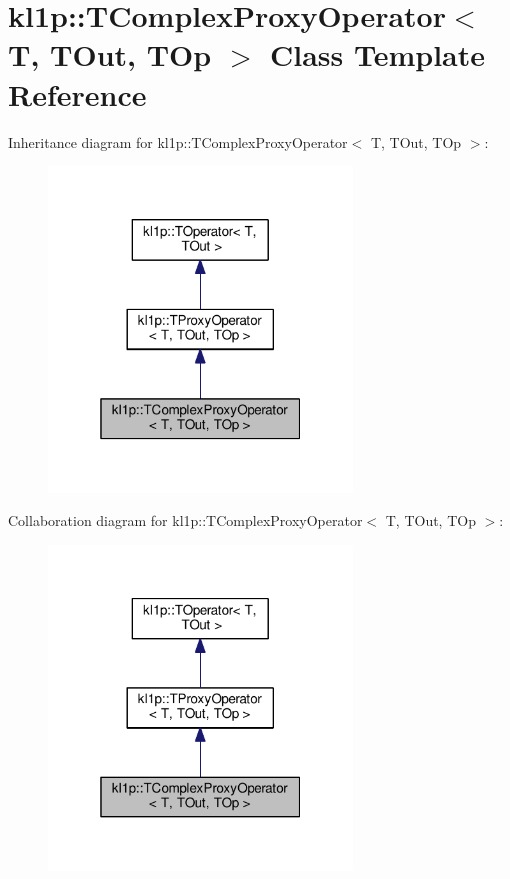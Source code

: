 \hypertarget{classkl1p_1_1TComplexProxyOperator}{}\section{kl1p\+:\+:T\+Complex\+Proxy\+Operator$<$ T, T\+Out, T\+Op $>$ Class Template Reference}
\label{classkl1p_1_1TComplexProxyOperator}


Inheritance diagram for kl1p\+:\+:T\+Complex\+Proxy\+Operator$<$ T, T\+Out, T\+Op $>$\+:
\nopagebreak
\begin{figure}[H]
\begin{center}
\leavevmode
\includegraphics[width=229pt]{classkl1p_1_1TComplexProxyOperator__inherit__graph}
\end{center}
\end{figure}


Collaboration diagram for kl1p\+:\+:T\+Complex\+Proxy\+Operator$<$ T, T\+Out, T\+Op $>$\+:
\nopagebreak
\begin{figure}[H]
\begin{center}
\leavevmode
\includegraphics[width=229pt]{classkl1p_1_1TComplexProxyOperator__coll__graph}
\end{center}
\end{figure}
